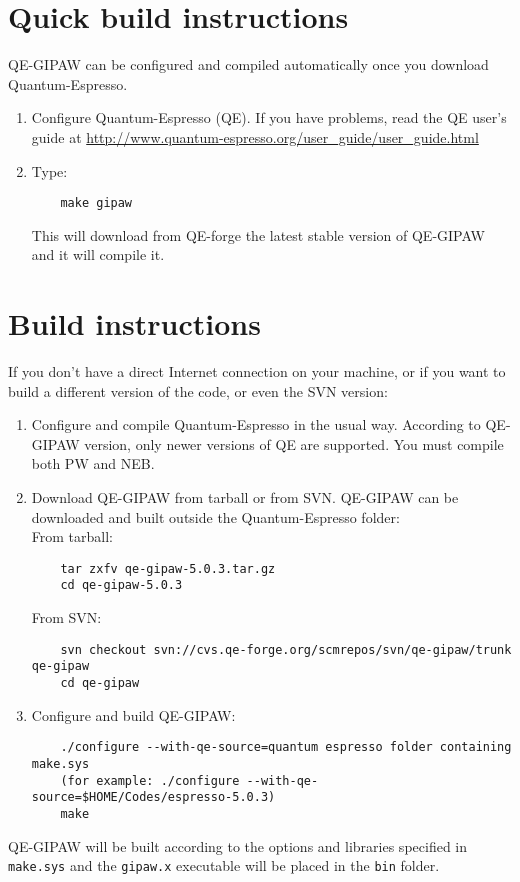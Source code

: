 \documentclass[a4paper,11pt,twoside]{article}
\begin{document}
\section{Quick build instructions}
QE-GIPAW can be configured and compiled automatically once you download Quantum-Espresso.
\begin{enumerate}
\item Configure Quantum-Espresso (QE). If you have problems, read the
QE user's guide at \url{http://www.quantum-espresso.org/user_guide/user_guide.html}
\item Type:
\begin{verbatim}
    make gipaw
\end{verbatim}
This will download from QE-forge the latest stable version of QE-GIPAW
and it will compile it.
\end{enumerate}

\section{Build instructions}
If you don't have a direct Internet connection on your machine, or if you want
to build a different version of the code, or even the SVN version:
\begin{enumerate}
\item Configure and compile Quantum-Espresso in the usual way. According
to QE-GIPAW version, only newer versions of QE are supported.
You must compile both PW and NEB.
\item Download QE-GIPAW from tarball or from SVN. QE-GIPAW can be
downloaded and built outside the Quantum-Espresso folder:\\
From tarball:
\begin{verbatim}
    tar zxfv qe-gipaw-5.0.3.tar.gz
    cd qe-gipaw-5.0.3
\end{verbatim}
From SVN:
\begin{verbatim}
    svn checkout svn://cvs.qe-forge.org/scmrepos/svn/qe-gipaw/trunk qe-gipaw
    cd qe-gipaw
\end{verbatim}
\item Configure and build QE-GIPAW:
\begin{verbatim}
    ./configure --with-qe-source=quantum espresso folder containing make.sys
    (for example: ./configure --with-qe-source=$HOME/Codes/espresso-5.0.3)
    make
\end{verbatim}
\end{enumerate}
QE-GIPAW will be built according to the options and libraries specified
in \texttt{make.sys} and the \texttt{gipaw.x} executable will be placed
in the \texttt{bin} folder.
\end{document}
